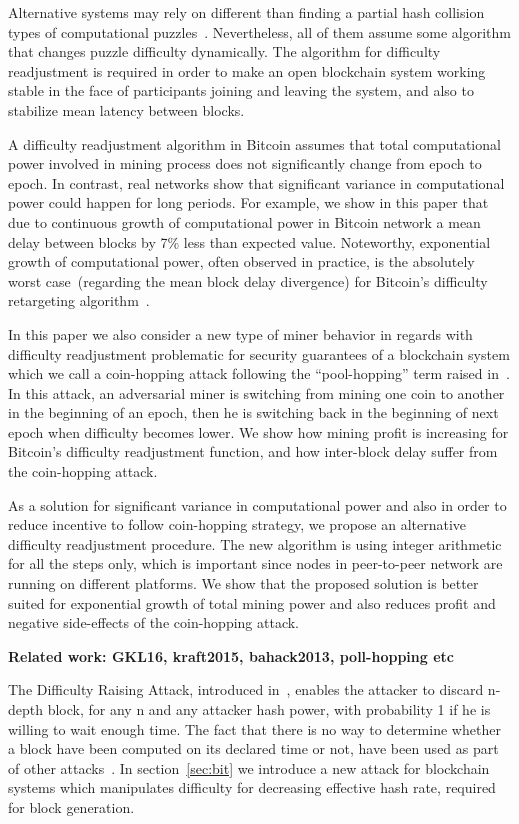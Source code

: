 \documentclass[]{llncs}
\begin{document}
Alternative systems may rely on different than finding a partial hash collision types of computational puzzles~\cite{miller2014permacoin,biryukov2017equihash}. Nevertheless, all of them assume some algorithm that changes puzzle difficulty dynamically. The algorithm for difficulty readjustment is required in order to make an open blockchain system working stable in the face of participants joining and leaving the system, and also to stabilize mean latency between blocks. 

A difficulty readjustment algorithm in Bitcoin assumes that total computational power involved in mining process does not significantly change from epoch to epoch. In contrast, real networks show that significant variance in computational power could happen for long periods.
For example, we show in this paper that due to continuous growth of computational power in Bitcoin network a mean delay between blocks by 7\% less than expected value.
Noteworthy, exponential growth of computational power, often observed in practice, is the absolutely worst case~(regarding the mean block delay divergence) for Bitcoin’s difficulty retargeting algorithm~\cite{kraft2015difficulty}.
 
In this paper we also consider a new type of miner behavior in regards with difficulty readjustment problematic for security guarantees of a blockchain system which we call a coin-hopping attack following the ``pool-hopping'' term raised in~\cite{rosenfeld2011analysis}. In this attack, an adversarial miner is switching from mining one coin to another in the beginning of an epoch, then he is switching back in the beginning of next epoch when difficulty becomes lower. We show how mining profit is increasing for Bitcoin's difficulty readjustment function, and how inter-block delay suffer from the coin-hopping attack.

As a solution for significant variance in computational power and also in order to reduce incentive to follow coin-hopping strategy, we propose an alternative difficulty readjustment procedure. The new algorithm is using integer arithmetic for all the steps only, which is important since nodes in peer-to-peer network are running on different platforms. We show that the proposed solution is better suited for exponential growth of total mining power and also reduces profit and negative side-effects of the coin-hopping attack.


\textbf{Related work: GKL16, kraft2015, bahack2013, poll-hopping etc}

The Difficulty Raising Attack, introduced in~\cite{bahack2013theoretical}, enables the attacker to discard n-depth block, for any n and any attacker hash power, with probability 1 if he is willing to wait enough time.
The fact that there is no way to determine whether a block have been computed on its declared time or not, have been used as part of other attacks~\cite{timejacking2011, artforz2011}.
In section~\ref{sec:bit} we introduce a new attack for blockchain systems which manipulates difficulty for decreasing effective hash rate, required for block generation.
\end{document}
